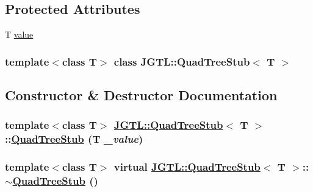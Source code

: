 \subsection*{Protected Attributes}
\begin{CompactItemize}
\item 
T \hyperlink{class_j_g_t_l_1_1_quad_tree_stub_2b4f08acca095e6e2f3f92afc9f0449e}{value}
\end{CompactItemize}
\subsubsection*{template$<$class T$>$ class JGTL::Quad\-Tree\-Stub$<$ T $>$}



\subsection{Constructor \& Destructor Documentation}
\hypertarget{class_j_g_t_l_1_1_quad_tree_stub_f93b1d865168c08ccfc5f9ceebaa8003}{
\subsubsection[QuadTreeStub]{\setlength{\rightskip}{0pt plus 5cm}template$<$class T$>$ \hyperlink{class_j_g_t_l_1_1_quad_tree_stub}{JGTL::Quad\-Tree\-Stub}$<$ T $>$::\hyperlink{class_j_g_t_l_1_1_quad_tree_stub}{Quad\-Tree\-Stub} (T {\em \_\-value})}}
\label{class_j_g_t_l_1_1_quad_tree_stub_f93b1d865168c08ccfc5f9ceebaa8003}


\hypertarget{class_j_g_t_l_1_1_quad_tree_stub_6106651b6f6f285ad1bb469f823ef8ad}{
\subsubsection[$\sim$QuadTreeStub]{\setlength{\rightskip}{0pt plus 5cm}template$<$class T$>$ virtual \hyperlink{class_j_g_t_l_1_1_quad_tree_stub}{JGTL::Quad\-Tree\-Stub}$<$ T $>$::$\sim$\hyperlink{class_j_g_t_l_1_1_quad_tree_stub}{Quad\-Tree\-Stub} ()}}
\label{class_j_g_t_l_1_1_quad_tree_stub_6106651b6f6f285ad1bb469f823ef8ad}




